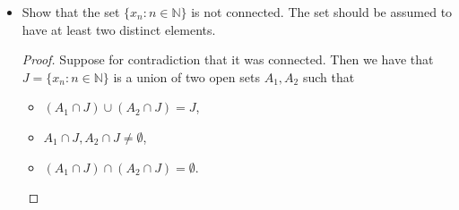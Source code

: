 \documentclass{article}
\begin{document}
\begin{itemize}
        \item Show that the set $\{x_{n} : n \in\mathbb{N}\}$ is not connected. The set should be assumed to have at least two distinct elements.
            \begin{proof}
                Suppose for contradiction that it was connected. Then we have that $J = \{x_{n} : n \in \mathbb{N}\}$ is a union of two open sets $A_{1}, A_{2}$ such that 
                    \begin{itemize}
                        \item $(A_{1} \cap J) \cup (A_{2} \cap J) = J$,

                        \item $A_{1} \cap J, A_{2} \cap J \neq \emptyset$, 

                        \item $(A_{1} \cap J) \cap (A_{2} \cap J) = \emptyset$. 
                    \end{itemize}
            \end{proof}
    \end{itemize}
\end{document}
